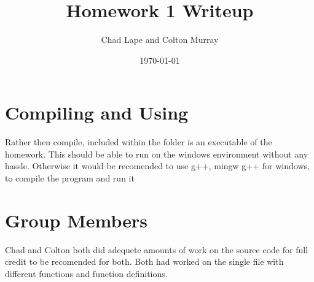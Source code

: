 \documentclass[a4paper, 12pt]{article}
\begin{document}
	\title{Homework 1 Writeup}
	\author{Chad Lape and Colton Murray}
	\date{\today}
	\maketitle
	
\section{Compiling and Using}
	Rather then compile, included within the folder is an executable of the homework. This should be able to run on the windows environment without any hassle. Otherwise it would be recomended to use g++, mingw g++ for windows, to compile the program and run it
	
\section{Group Members}
	Chad and Colton both did adequete amounts of work on the source code for full credit to be recomended for both. Both had worked on the single file with different functions and function definitions.
\end{document}

